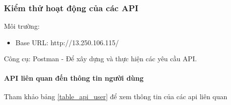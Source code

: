 \subsubsection{Kiểm thử hoạt động của các API}


Môi trường: 

\begin{adjustwidth}{2em}{}
\begin{itemize}
  \item Base URL: http://13.250.106.115/
\end{itemize}
\end{adjustwidth}

Công cụ: Postman - Để xây dựng và thực hiện các yêu cầu API.



\paragraph{API liên quan đến thông tin người dùng}
\mbox{}

Tham khảo bảng \ref{table_api_user} để xem thông tin của các api liên quan

